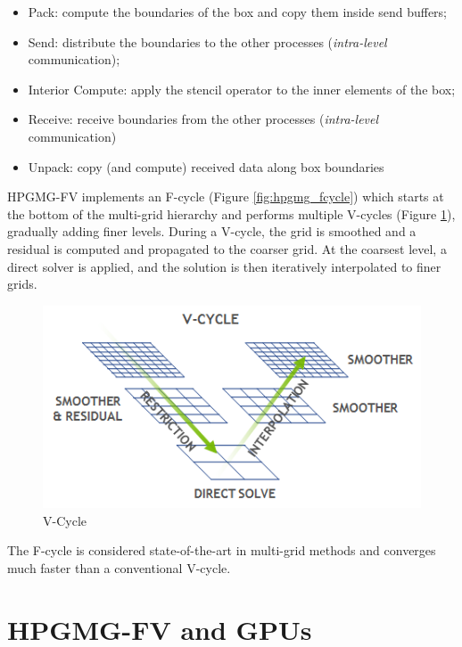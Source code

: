 \documentclass[review]{siamart1116}
\begin{document}
\begin{itemize}
\item Pack: compute the boundaries of the box and copy them inside send buffers;
\item Send: distribute the boundaries to the other processes (\emph{intra-level} communication);
\item Interior Compute: apply the stencil operator to the inner elements of the box;
\item Receive: receive boundaries from the other processes (\emph{intra-level} communication)
\item Unpack: copy (and compute) received data along box boundaries
\end{itemize}

HPGMG-FV implements an F-cycle (Figure \ref{fig:hpgmg_fcycle}) which starts at the bottom of the multi-grid hierarchy and performs multiple V-cycles (Figure \ref{fig:hpgmg_vcycle}), gradually adding finer levels. %
During a V-cycle, the grid is smoothed and a residual is computed and propagated to the coarser grid. At the coarsest level, a direct solver is applied, and the solution is then iteratively interpolated to finer grids.

\begin{figure}[h]
\centering
\includegraphics[scale=0.7]{hpgmg_v_cycle.png}
\caption{V-Cycle}
\label{fig:hpgmg_vcycle}
\end{figure}

The F-cycle is considered state-of-the-art in multi-grid methods and converges much faster than a conventional V-cycle.

\section{HPGMG-FV and GPUs}\label{sec:hpgmg_cuda}
\end{document}

